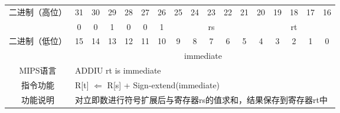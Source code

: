\clearpage

\begin{table}
\begin{tabular}{|c|c|c|c|c|c|c|c|c|c|c|c|c|c|c|c|c|}
\hline
\multirow{2}{*}{二进制（高位）} &
31&30&29&28&27&26&25&24&23&22&21&20&19&18&17&16\\
\cline{2-17}
&0&0&1&0&0&1&
\multicolumn{5}{c|}{rs}&
\multicolumn{5}{c|}{rt}\\
\hline
\multirow{2}{*}{二进制（低位）} &
15&14&13&12&11&10&9&8&7&6&5&4&3&2&1&0\\
\cline{2-17}
&
\multicolumn{16}{c|}{immediate}\\
\hline
MIPS语言&
\multicolumn{16}{l|}{ADDIU rt is immediate}\\
\hline
指令功能&
\multicolumn{16}{l|}{R[t] $\Leftarrow$ R[s] + Sign-extend(immediate)}\\
\hline
功能说明&
\multicolumn{16}{l|}{对立即数进行符号扩展后与寄存器rs的值求和，结果保存到寄存器rt中}\\
\hline
\end{tabular}
\end{table}

